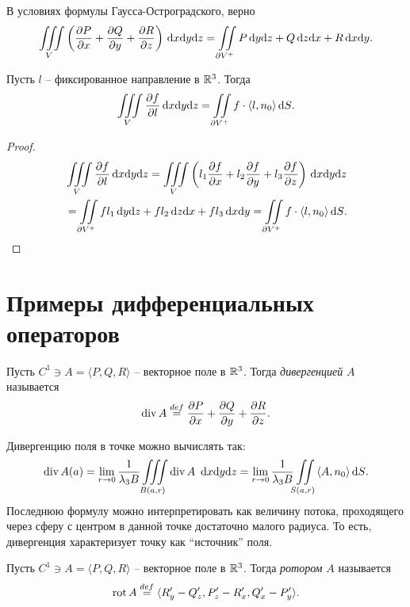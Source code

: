 \begin{corollary}
    В условиях формулы Гаусса-Остроградского, верно
\[
    \iiint\limits_{V}{\left(\dfrac{\partial P}{\partial x} + \dfrac{\partial Q}{\partial y} + \dfrac{\partial R}{\partial z}\right) \,\mathrm{d} x \mathrm{d} y \mathrm{d} z} = 
    \iint\limits_{\partial V^+}{P \,\mathrm{d} y \mathrm{d} z + Q \,\mathrm{d} z \mathrm{d} x + R \,\mathrm{d} x \mathrm{d} y}
.\] 
\end{corollary}

\begin{corollary}
    Пусть $l$ -- фиксированное направление в $\mathbb{R}^3$. Тогда
\[
    \iiint\limits_{V}{\dfrac{\partial f}{\partial l} \,\mathrm{d} x \mathrm{d} y \mathrm{d} z} = 
    \iint\limits_{\partial V^+}{f \cdot \langle l, n_0 \rangle \,\mathrm{d} S}
.\] 
\end{corollary}
\begin{proof}
    \begin{align*}
        &\iiint\limits_V{\dfrac{\partial f}{\partial l} \,\mathrm{d} x \mathrm{d} y \mathrm{d} z} =
        \iiint\limits_V{\left( l_1 \dfrac{\partial f}{\partial x} + l_2 \dfrac{\partial f}{\partial y} + l_3 \dfrac{\partial f}{\partial z} \right) \,\mathrm{d} x \mathrm{d} y \mathrm{d} z} \\
        &= \iint\limits_{\partial V^+}{f l_1 \,\mathrm{d} y \mathrm{d} z + f l_2 \,\mathrm{d} z \mathrm{d} x + f l_3 \,\mathrm{d} x \mathrm{d} y}
        = \iint\limits_{\partial V^+}{f \cdot \langle l, n_0 \rangle \,\mathrm{d} S}
    .\end{align*}
\end{proof}

\section{Примеры дифференциальных операторов}

\begin{definition}
    Пусть $C^1 \ni A = \langle P, Q, R \rangle$ -- векторное поле в $\mathbb{R}^3$. Тогда
    \textit{дивергенцией} $A$ называется
\[
    \operatorname{div} A \overset{def}{\underset{}{=}} \dfrac{\partial P}{\partial x} + \dfrac{\partial Q}{\partial y} + \dfrac{\partial R}{\partial z}
.\] 
\end{definition}

\begin{remark}
    Дивергенцию поля в точке можно вычислять так:
\[
    \operatorname{div} A(a) = \lim_{r \to 0}{\frac{1}{\lambda_3 B} \iiint\limits_{B(a, r)}{\operatorname{div} A~ \,\mathrm{d} x \mathrm{d} y \mathrm{d} z}} =
    \lim_{r \to 0}{\frac{1}{\lambda_3 B} \iint\limits_{S(a, r)}{\langle A, n_0 \rangle} \,\mathrm{d} S}
.\] 
    Последнюю формулу можно интерпретировать как величину потока, проходящего через
    сферу с центром в данной точке достаточно малого радиуса. То есть, дивергенция
    характеризует точку как ``источник'' поля.
\end{remark}

\begin{definition}
    Пусть $C^1 \ni A = \langle P, Q, R \rangle$ -- векторное поле в $\mathbb{R}^3$. Тогда 
    \textit{ротором} $A$ называется
\[
    \operatorname{rot} A \overset{def}{\underset{}{=}} \langle R'_y - Q'_z, P'_z - R'_x, Q'_x - P'_y \rangle
.\] 
\end{definition}

